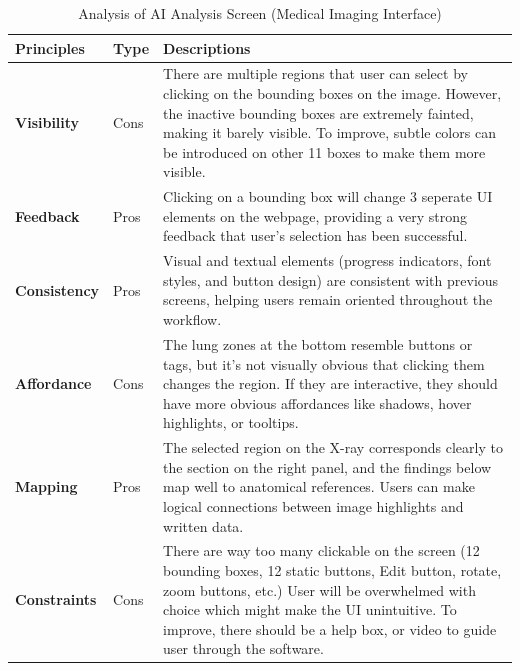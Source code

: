 \documentclass[12pt, titlepage]{article}
\begin{document}
\begin{table}[h!]
    \centering
    \begin{tabular}{|p{2.5cm}|p{1.5cm}|p{11cm}|}
    \hline
    \rowcolor{gray!30}
    \textbf{Principles} & \textbf{Type} & \textbf{Descriptions} \\
    \hline
    \textbf{Visibility} & Cons & There are multiple regions that user can select by clicking on the bounding boxes on the image. However, the inactive bounding boxes are extremely fainted, making it barely visible. To improve, subtle colors can be introduced on other 11 boxes to make them more visible.\\
    \hline
    \textbf{Feedback} & Pros & Clicking on a bounding box will change 3 seperate UI elements on the webpage, providing a very strong feedback that user's selection has been successful. \\
    \hline
    \textbf{Consistency} & Pros & Visual and textual elements (progress indicators, font styles, and button design) are consistent with previous screens, helping users remain oriented throughout the workflow. \\
    \hline
    \textbf{Affordance} & Cons & The lung zones at the bottom resemble buttons or tags, but it’s not visually obvious that clicking them changes the region. If they are interactive, they should have more obvious affordances like shadows, hover highlights, or tooltips. \\
    \hline
    \textbf{Mapping} & Pros & The selected region on the X-ray corresponds clearly to the section on the right panel, and the findings below map well to anatomical references. Users can make logical connections between image highlights and written data. \\
    \hline
    \textbf{Constraints} & Cons & There are way too many clickable on the screen (12 bounding boxes, 12 static buttons, Edit button, rotate, zoom buttons, etc.) User will be overwhelmed with choice which might make the UI unintuitive. To improve, there should be a help box, or video to guide user through the software.  \\
    \hline
    \end{tabular}
    \caption{Analysis of AI Analysis Screen (Medical Imaging Interface)}
\end{table}
\end{document}
